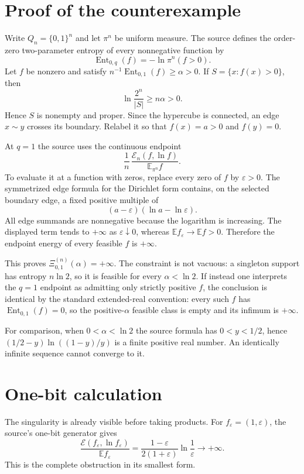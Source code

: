 \documentclass[11pt]{article}
\newcommand{\Ent}{\operatorname{Ent}}
\newcommand{\E}{\mathcal E}
\newcommand{\XiN}{\Xi^{(n)}}
\begin{document}
\clearpage
\section*{Proof of the counterexample}
Write $Q_n=\{0,1\}^n$ and let $\pi^n$ be uniform measure.  The source defines
the order-zero two-parameter entropy of every nonnegative function by
\[
 \Ent_{0,q}(f)=-\ln\pi^n(f>0).
\]
Let $f$ be nonzero and satisfy
$n^{-1}\Ent_{0,1}(f)\ge\alpha>0$.  If
$S=\{x:f(x)>0\}$, then
\[
  \ln\frac{2^n}{|S|}\ge n\alpha>0.
\]
Hence $S$ is nonempty and proper.  Since the hypercube is connected, an
edge $x\sim y$ crosses its boundary.  Relabel it so that
$f(x)=a>0$ and $f(y)=0$.

At $q=1$ the source uses the continuous endpoint
\[
 \frac1n\,\frac{\E_n(f,\ln f)}{\mathbb E_{\pi^n}f}.
\]
To evaluate it at a function with zeros, replace every zero of $f$ by
$\varepsilon>0$.  The symmetrized edge formula for the Dirichlet form
contains, on the selected boundary edge, a fixed positive multiple of
\[
 (a-\varepsilon)(\ln a-\ln\varepsilon).
\]
All edge summands are nonnegative because the logarithm is increasing.
The displayed term tends to $+\infty$ as $\varepsilon\downarrow0$, whereas
$\mathbb E f_\varepsilon\to\mathbb E f>0$.  Therefore the endpoint energy
of every feasible $f$ is $+\infty$.

This proves $\XiN_{0,1}(\alpha)=+\infty$.  The constraint is not vacuous:
a singleton support has entropy $n\ln2$, so it is feasible for every
$\alpha<\ln2$.  If instead one interprets the $q=1$ endpoint as admitting
only strictly positive $f$, the conclusion is identical by the standard
extended-real convention: every such $f$ has $\Ent_{0,1}(f)=0$, so the
positive-$\alpha$ feasible class is empty and its infimum is $+\infty$.

For comparison, when $0<\alpha<\ln2$ the source formula has
$0<y<1/2$, hence
$(1/2-y)\ln((1-y)/y)$ is a finite positive real number.  An identically
infinite sequence cannot converge to it.

\section*{One-bit calculation}
The singularity is already visible before taking products.  For
$f_\varepsilon=(1,\varepsilon)$, the source's one-bit generator gives
\[
 \frac{\E(f_\varepsilon,\ln f_\varepsilon)}{\mathbb E f_\varepsilon}
 =\frac{1-\varepsilon}{2(1+\varepsilon)}
    \ln\frac1\varepsilon \longrightarrow+\infty.
\]
This is the complete obstruction in its smallest form.
\end{document}
